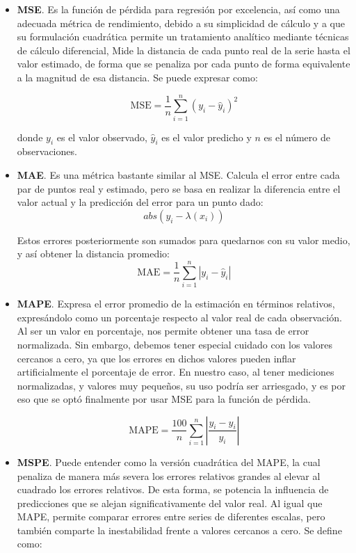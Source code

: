 \begin{itemize}
	\item \textbf{MSE}. Es la función de pérdida para regresión por excelencia, así como una adecuada métrica de rendimiento, debido a su simplicidad de cálculo y a que su formulación cuadrática permite un tratamiento analítico mediante técnicas de cálculo diferencial, Mide la distancia de cada punto real de la serie hasta el valor estimado, de forma que se penaliza por cada punto de forma equivalente a la magnitud de esa distancia. Se puede expresar como:
	
	$$\mathrm{MSE} = \frac{1}{n} \sum_{i=1}^n (y_i - \hat{y}_i)^2$$ 
	
	donde \(y_i\) es el valor observado, \(\hat{y}_i\) es el valor predicho y \(n\) es el número de observaciones.  
	
	
	\item \textbf{MAE}. Es una métrica bastante similar al MSE. Calcula el error entre cada par de puntos real y estimado, pero se basa en realizar la diferencia entre el valor actual y la predicción del error para un punto dado:
	$$abs(y_i - \lambda (x_i))$$
	
	Estos errores posteriormente son sumados para quedarnos con su valor medio, y así obtener la distancia promedio:
	$$\mathrm{MAE} = \frac{1}{n} \sum_{i=1}^n \left| y_i - \hat{y}_i \right|$$
	
	
	\item \textbf{MAPE}. Expresa el error promedio de la estimación en términos relativos, expresándolo como un porcentaje respecto al valor real de cada observación. Al ser un valor en porcentaje, nos permite obtener una tasa de error normalizada. Sin embargo, debemos tener especial cuidado con los valores cercanos a cero, ya que los errores en dichos valores pueden inflar artificialmente el porcentaje de error. En nuestro caso, al tener mediciones normalizadas, y valores muy pequeños, su uso podría ser arriesgado, y es por eso que se optó finalmente por usar MSE para la función de pérdida.
	
	$$
	\mathrm{MAPE} = \frac{100}{n} \sum_{i=1}^n \left| \frac{y_i - \hat{y}_i}{y_i} \right|
	$$
	
	
	\item \textbf{MSPE}. Puede entender como la versión cuadrática del MAPE, la cual penaliza de manera más severa los errores relativos grandes al elevar al cuadrado los errores relativos. De esta forma, se potencia la influencia de predicciones que se alejan significativamente del valor real. Al igual que MAPE, permite comparar errores entre series de diferentes escalas, pero también comparte la inestabilidad frente a valores cercanos a cero. Se define como:
	

\end{itemize}

